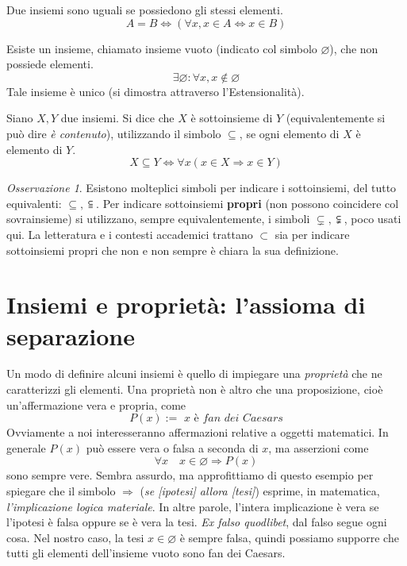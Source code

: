 \documentclass[oneside]{book}
\theoremstyle{remark}
\newtheorem*{osservaz}{Osservazione}
\begin{document}
\begin{tcolorbox}[colback=yellow!30, colframe=yellow!30!black, title={Assioma di Estensionalità}]
Due insiemi sono uguali se possiedono gli stessi elementi.
\[ A = B \Longleftrightarrow (\forall x,x\in A \Leftrightarrow x \in B) \]
\end{tcolorbox}

\begin{tcolorbox}[colback=yellow!30, colframe=yellow!30!black, title=Esistenza dell'insieme vuoto]
Esiste un insieme, chiamato insieme vuoto (indicato col simbolo $\varnothing$), che non possiede elementi.
\[\exists \varnothing:\forall x, x\not\in\varnothing\]
Tale insieme è unico (si dimostra attraverso l'Estensionalità).
\end{tcolorbox}

\begin{tcolorbox}[colback=yellow!30, colframe=yellow!30!black, title={Sottoinsiemi}]
Siano $X,Y$ due insiemi. Si dice che $X$ è sottoinsieme di $Y$
(equivalentemente si può dire \emph{è contenuto}), utilizzando il simbolo $\subseteq$,
se ogni elemento di $X$ è elemento di $Y$.
\[ X \subseteq Y \Longleftrightarrow \forall x(x\in X \Rightarrow x\in Y) \]
\end{tcolorbox}

\begin{osservaz}
Esistono molteplici simboli per indicare i
sottoinsiemi, del tutto equivalenti: $\subseteq,\subseteqq$. Per indicare sottoinsiemi
\textbf{propri} (non possono coincidere col sovrainsieme) si utilizzano,
sempre equivalentemente, i simboli $\subsetneq,\subsetneqq$, poco usati
qui. La letteratura e i contesti accademici trattano $\subset$ sia per
indicare sottoinsiemi propri che non e non sempre è chiara la sua definizione.
\end{osservaz}

\section{Insiemi e proprietà: l'assioma di separazione}
Un modo di definire alcuni insiemi è quello di impiegare una \textit{proprietà}
che ne caratterizzi gli elementi. Una proprietà non è altro che una proposizione,
cioè un'affermazione vera e propria, come
\[ P(x) := \textit{ x è fan dei Caesars} \]
Ovviamente a noi interesseranno affermazioni relative a oggetti matematici.
In generale $P(x)$ può essere vera o falsa a seconda di $x$, ma asserzioni come
\[ \forall x \quad x\in\varnothing\Longrightarrow P(x) \]
sono sempre vere. Sembra assurdo, ma approfittiamo di questo esempio per
spiegare che il simbolo $\Longrightarrow$ (\textit{se [ipotesi] allora [tesi]}) esprime, in matematica, \textit{l'implicazione logica materiale}.
In altre parole, l'intera implicazione è vera se l'ipotesi è falsa oppure se
è vera la tesi. \textit{Ex falso quodlibet}, dal falso segue ogni cosa. Nel
nostro caso, la tesi $x\in\varnothing$ è sempre falsa, quindi possiamo
supporre che tutti gli elementi dell'insieme vuoto sono fan dei Caesars.
\end{document}
